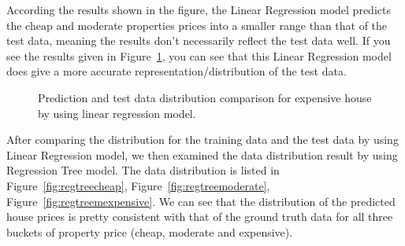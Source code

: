 \documentclass[11pt,a4paper]{article}
\begin{document}
\medskip

According the results shown in the figure, the Linear Regression model predicts the cheap and moderate properties prices into a smaller range than that of the test data, meaning the results don't necessarily reflect the test data well. If you see the results given in Figure~\ref{fig:linearexpensive}, you can see that this Linear Regression model does give a more accurate representation/distribution of the test data.

\begin{figure}[h]
    \centering
    \hfill%
    \caption{Prediction and test data distribution comparison for expensive house by using linear regression model.}
    \label{fig:linearexpensive}
\end{figure}


\FloatBarrier
After comparing the distribution for the training data and the test data by using Linear Regression model, we then examined the data distribution result by using Regression Tree model. The data distribution is listed in Figure~\ref{fig:regtreecheap}, Figure~\ref{fig:regtreemoderate}, Figure~\ref{fig:regtreemexpensive}. We can see that the distribution of the predicted house prices is pretty consistent with that of the ground truth data for all three buckets of property price (cheap, moderate and expensive).
\end{document}
